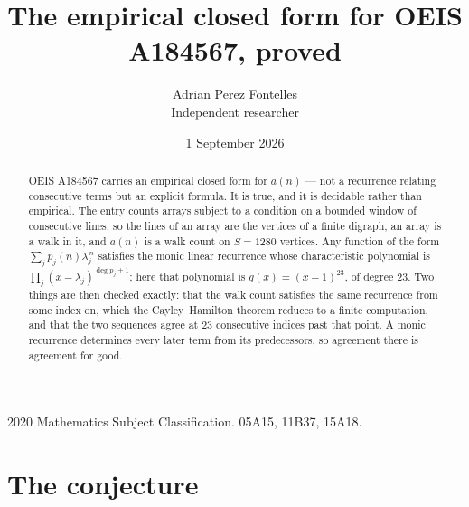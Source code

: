 \documentclass[11pt,a4paper]{article}
\title{The empirical closed form for OEIS A184567, proved}
\author{Adrian Perez Fontelles\\ \small Independent researcher}
\date{1 September 2026}
\theoremstyle{plain}
\theoremstyle{definition}
\begin{document}
\maketitle

\begin{abstract}
OEIS A184567 carries an empirical closed form for $a(n)$ --- not a recurrence relating
consecutive terms but an explicit formula. It is true, and it is decidable rather than
empirical. The entry counts arrays subject to a condition on a bounded window of consecutive lines, so the lines of an array are the
vertices of a finite digraph, an array is a walk in it, and $a(n)$ is a walk count on
$S=1280$ vertices. Any function of the form $\sum_j p_j(n)\lambda_j^{\,n}$ satisfies the
monic linear recurrence whose characteristic polynomial is
$\prod_j(x-\lambda_j)^{\deg p_j+1}$; here that polynomial is $q(x)=(x-1)^{23}$, of degree
$23$. Two things are then checked exactly: that the walk count satisfies the same
recurrence from some index on, which the Cayley--Hamilton theorem reduces to a finite
computation, and that the two sequences agree at $23$ consecutive indices past that
point. A monic recurrence determines every later term from its predecessors, so agreement
there is agreement for good.
\end{abstract}

\noindent\small 2020 Mathematics Subject Classification. 05A15, 11B37, 15A18.\normalsize

\section{The conjecture}
\end{document}
